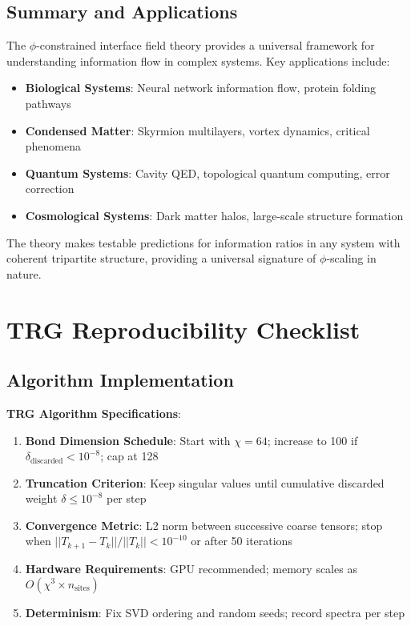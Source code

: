 \documentclass[11pt]{article}
\theoremstyle{definition}
\newcommand{\goldenratio}{\phi}
\begin{document}
\subsection{Summary and Applications}

The $\goldenratio$-constrained interface field theory provides a universal framework for understanding information flow in complex systems. Key applications include:

\begin{itemize}
\item \textbf{Biological Systems}: Neural network information flow, protein folding pathways
\item \textbf{Condensed Matter}: Skyrmion multilayers, vortex dynamics, critical phenomena
\item \textbf{Quantum Systems}: Cavity QED, topological quantum computing, error correction
\item \textbf{Cosmological Systems}: Dark matter halos, large-scale structure formation
\end{itemize}

The theory makes testable predictions for information ratios in any system with coherent tripartite structure, providing a universal signature of $\goldenratio$-scaling in nature.

\section{TRG Reproducibility Checklist}

\subsection{Algorithm Implementation}

\textbf{TRG Algorithm Specifications}:
\begin{enumerate}
\item \textbf{Bond Dimension Schedule}: Start with $\chi = 64$; increase to 100 if $\delta_{\text{discarded}} < 10^{-8}$; cap at 128
\item \textbf{Truncation Criterion}: Keep singular values until cumulative discarded weight $\delta \leq 10^{-8}$ per step
\item \textbf{Convergence Metric}: L2 norm between successive coarse tensors; stop when $||T_{k+1} - T_k||/||T_k|| < 10^{-10}$ or after 50 iterations
\item \textbf{Hardware Requirements}: GPU recommended; memory scales as $O(\chi^3 \times n_{\text{sites}})$
\item \textbf{Determinism}: Fix SVD ordering and random seeds; record spectra per step
\end{enumerate}
\end{document}
